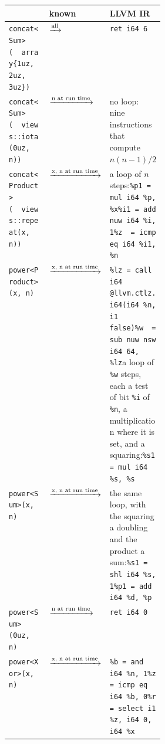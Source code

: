\begin{figure}[htbp]
\small
\begin{tabularx}{\linewidth}{@{}>{\raggedright\arraybackslash}p{0.34\linewidth}l>{\raggedright\arraybackslash}X@{}}
\toprule
\Cpp{} & known & LLVM IR \\
\midrule
\texttt{concat<Sum>(}\newline\texttt{\ \ array\{1uz, 2uz, 3uz\})} & $\xrightarrow{\text{\scriptsize all}}$ & \texttt{ret i64 6} \\[3pt]
\texttt{concat<Sum>(}\newline\texttt{\ \ views::iota(0uz, n))} & $\xrightarrow{\text{\scriptsize n at run time}}$ & no loop: nine instructions that compute $n(n-1)/2$ \\[3pt]
\texttt{concat<Product>(}\newline\texttt{\ \ views::repeat(x, n))} & $\xrightarrow{\text{\scriptsize x, n at run time}}$ & a loop of $n$ steps:\newline \texttt{\%p1 = mul i64 \%p, \%x}\newline \texttt{\%i1 = add nuw i64 \%i, 1}\newline \texttt{\%z\ \ = icmp eq i64 \%i1, \%n} \\[3pt]
\texttt{power<Product>(x, n)} & $\xrightarrow{\text{\scriptsize x, n at run time}}$ & \texttt{\%lz = call i64 @llvm.ctlz.i64(i64 \%n, i1 false)}\newline \texttt{\%w\ \ = sub nuw nsw i64 64, \%lz}\newline a loop of \texttt{\%w} steps, each a test of bit \texttt{\%i} of \texttt{\%n}, a multiplication where it is set, and a squaring:\newline \texttt{\%s1 = mul i64 \%s, \%s} \\[3pt]
\texttt{power<Sum>(x, n)} & $\xrightarrow{\text{\scriptsize x, n at run time}}$ & the same loop, with the squaring a doubling and the product a sum:\newline \texttt{\%s1 = shl i64 \%s, 1}\newline \texttt{\%p1 = add i64 \%d, \%p} \\[3pt]
\texttt{power<Sum>(0uz, n)} & $\xrightarrow{\text{\scriptsize n at run time}}$ & \texttt{ret i64 0} \\[3pt]
\texttt{power<Xor>(x, n)} & $\xrightarrow{\text{\scriptsize x, n at run time}}$ & \texttt{\%b = and i64 \%n, 1}\newline \texttt{\%z = icmp eq i64 \%b, 0}\newline \texttt{\%r = select i1 \%z, i64 0, i64 \%x} \\[3pt]

\end{tabularx}
\end{figure}
